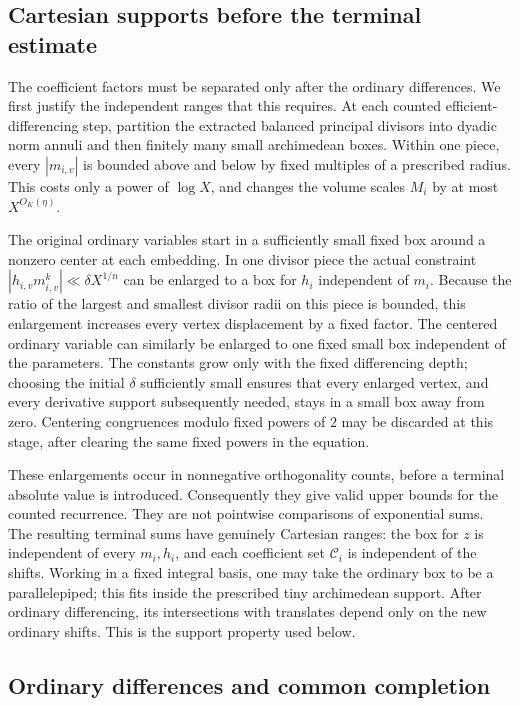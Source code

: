 \documentclass[11pt,reqno]{amsart}
\numberwithin{equation}{section}
\theoremstyle{definition}
\begin{document}
\subsection{Cartesian supports before the terminal estimate}

The coefficient factors must be separated only after the ordinary
differences. We first justify the independent ranges that this requires.
At each counted efficient-differencing step, partition the extracted
balanced principal divisors into dyadic norm annuli and then finitely many
small archimedean boxes. Within one piece, every $|m_{i,v}|$ is bounded
above and below by fixed multiples of a prescribed radius. This costs only
a power of $\log X$, and changes the volume scales $M_i$ by at most
$X^{O_K(\eta)}$.

The original ordinary variables start in a sufficiently small fixed box
around a nonzero center at each embedding. In one divisor piece the actual
constraint $|h_{i,v}m_{i,v}^k|\ll\delta X^{1/n}$ can be enlarged to a
box for $h_i$ independent of $m_i$. Because the ratio of the largest and
smallest divisor radii on this piece is bounded, this enlargement increases
every vertex displacement by a fixed factor. The centered ordinary variable
can similarly be enlarged to one fixed small box independent of the
parameters. The constants grow only with the fixed differencing depth;
choosing the initial $\delta$ sufficiently small ensures that every enlarged
vertex, and every derivative support subsequently needed, stays in a small
box away from zero. Centering congruences modulo fixed powers of $2$ may be
discarded at this stage, after clearing the same fixed powers in the equation.

These enlargements occur in nonnegative orthogonality counts, before a
terminal absolute value is introduced. Consequently they give valid upper
bounds for the counted recurrence. They are not pointwise comparisons of
exponential sums. The resulting terminal sums have genuinely Cartesian
ranges: the box for $z$ is independent of every $m_i,h_i$, and each
coefficient set $\mathcal C_i$ is independent of the shifts. Working in a
fixed integral basis, one may take the ordinary box to be a parallelepiped;
this fits inside the prescribed tiny archimedean support. After ordinary
differencing, its intersections with translates depend only on the new
ordinary shifts. This is the support property used below.

\subsection{Ordinary differences and common completion}
\end{document}
